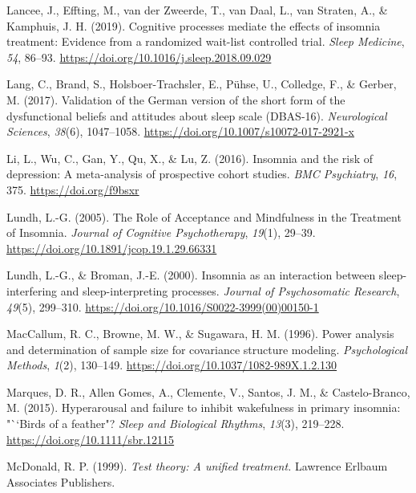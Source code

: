 \documentclass[
  ,doc,11pt, twoside,floatsintext]{apa6}
\newlength{\cslhangindent}
\newlength{\cslentryspacingunit} %
\newenvironment{CSLReferences}[2] %
 {%
  \setlength{\parindent}{0pt}
  \ifodd #1
  \let\oldpar\par
  \def\par{\hangindent=\cslhangindent\oldpar}
  \fi
  \setlength{\parskip}{#2\cslentryspacingunit}
 }%
 {}
\begin{document}
\begin{CSLReferences}{1}{0}
\leavevmode{}%
Lancee, J., Effting, M., van der Zweerde, T., van Daal, L., van Straten, A., \& Kamphuis, J. H. (2019). Cognitive processes mediate the effects of insomnia treatment: Evidence from a randomized wait-list controlled trial. \emph{Sleep Medicine}, \emph{54}, 86--93. \url{https://doi.org/10.1016/j.sleep.2018.09.029}

\leavevmode{}%
Lang, C., Brand, S., Holsboer-Trachsler, E., Pühse, U., Colledge, F., \& Gerber, M. (2017). Validation of the {German} version of the short form of the dysfunctional beliefs and attitudes about sleep scale ({DBAS-16}). \emph{Neurological Sciences}, \emph{38}(6), 1047--1058. \url{https://doi.org/10.1007/s10072-017-2921-x}

\leavevmode{}%
Li, L., Wu, C., Gan, Y., Qu, X., \& Lu, Z. (2016). Insomnia and the risk of depression: A meta-analysis of prospective cohort studies. \emph{BMC Psychiatry}, \emph{16}, 375. \url{https://doi.org/f9bsxr}

\leavevmode{}%
Lundh, L.-G. (2005). The {Role} of {Acceptance} and {Mindfulness} in the {Treatment} of {Insomnia}. \emph{Journal of Cognitive Psychotherapy}, \emph{19}(1), 29--39. \url{https://doi.org/10.1891/jcop.19.1.29.66331}

\leavevmode{}%
Lundh, L.-G., \& Broman, J.-E. (2000). Insomnia as an interaction between sleep-interfering and sleep-interpreting processes. \emph{Journal of Psychosomatic Research}, \emph{49}(5), 299--310. \url{https://doi.org/10.1016/S0022-3999(00)00150-1}

\leavevmode{}%
MacCallum, R. C., Browne, M. W., \& Sugawara, H. M. (1996). Power analysis and determination of sample size for covariance structure modeling. \emph{Psychological Methods}, \emph{1}(2), 130--149. \url{https://doi.org/10.1037/1082-989X.1.2.130}

\leavevmode{}%
Marques, D. R., Allen Gomes, A., Clemente, V., Santos, J. M., \& Castelo-Branco, M. (2015). Hyperarousal and failure to inhibit wakefulness in primary insomnia: "``Birds of a feather"? \emph{Sleep and Biological Rhythms}, \emph{13}(3), 219--228. \url{https://doi.org/10.1111/sbr.12115}

\leavevmode{}%
McDonald, R. P. (1999). \emph{Test theory: A unified treatment.} Lawrence Erlbaum Associates Publishers.


\end{CSLReferences}
\end{document}
